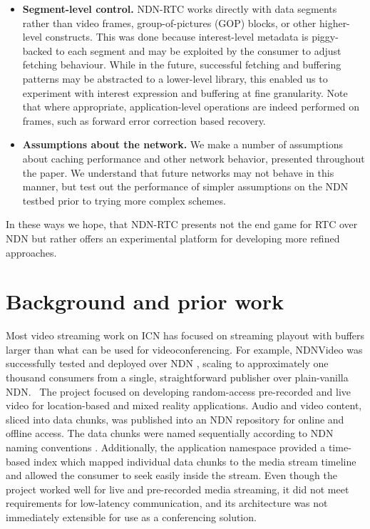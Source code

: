 \documentclass{icn/sig-alternate-2013} %
\newcommand{\ndnrtcName}{NDN-RTC} %
\begin{document}
\begin{itemize} 

\item \textbf{Segment-level control.}  \ndnrtcName{} works directly with data segments rather than video frames, group-of-pictures (GOP) blocks, or other higher-level constructs.  This was done because interest-level metadata is piggy-backed to each segment and may be exploited by the consumer to adjust fetching behaviour. %
While in the future, successful fetching and buffering patterns may be abstracted to a lower-level library, this enabled us to experiment with interest expression and buffering at fine granularity.  Note that where appropriate, application-level operations are indeed performed on frames, such as forward error correction based recovery. 

\item \textbf{Assumptions about the network.}  We make a number of  assumptions about caching performance and other network behavior, presented throughout the paper. We understand that future networks may not behave in this manner, but test out the performance of simpler assumptions on the NDN testbed prior to trying more complex schemes.  

\end{itemize}

In these ways we hope, that \ndnrtcName{} presents not the end game for RTC over NDN but rather offers an experimental platform for developing more refined approaches. 

\section{Background and prior work}
\label{sec:bg}


Most video streaming work on ICN has focused on streaming playout with buffers larger than what can be used for videoconferencing.  For example, NDNVideo was successfully tested and deployed over NDN \cite{ndnvideo}, scaling to approximately one thousand consumers from a single, straightforward publisher over plain-vanilla NDN.~\cite{CrowleyNEAPresentation} The project focused on developing random-access pre-recorded and live video for location-based and mixed reality applications. Audio and video content, sliced into data chunks, was published into an NDN repository for online and offline access. The data chunks were named sequentially according to NDN naming conventions \cite{ndnnaming}. Additionally, the application namespace provided a time-based index which mapped individual data chunks to the media stream timeline and allowed the consumer to seek easily inside the stream. Even though the project worked well for live and pre-recorded media streaming, it did not meet requirements for low-latency communication, and its architecture was not immediately extensible for use as a conferencing solution.
\end{document}
